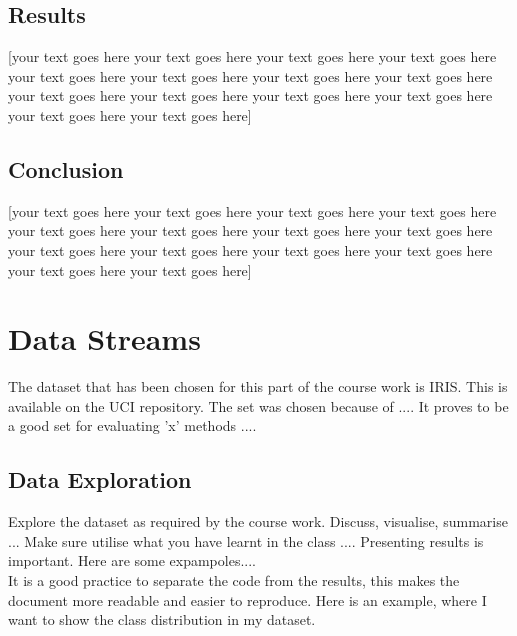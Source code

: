 \documentclass[10pt]{article}
\begin{document}
\subsection{Results}
[your text goes here your text goes here your text goes here your text goes here your text goes here your text goes here your text goes here your text goes here your text goes here your text goes here your text goes here your text goes here your text goes here your text goes here]
\subsection{Conclusion}

[your text goes here your text goes here your text goes here your text goes here your text goes here your text goes here your text goes here your text goes here your text goes here your text goes here your text goes here your text goes here your text goes here your text goes here]




\section {Data Streams}

The dataset that has been chosen for this part of the course work is IRIS. This is available on the UCI repository. The set was chosen because of .... It proves to be a good set for evaluating 'x' methods .... 

\subsection{Data Exploration}

Explore the dataset as required by the course work. Discuss, visualise, summarise ... Make sure utilise what you have learnt in the class .... Presenting results is important. Here are some expampoles.... \\

It is a good practice to separate the code from the results, this makes the document more readable and easier to reproduce. Here is an example, where I want to show the class distribution in my dataset.


\begin{Schunk}
\end{Schunk}
\end{document}
